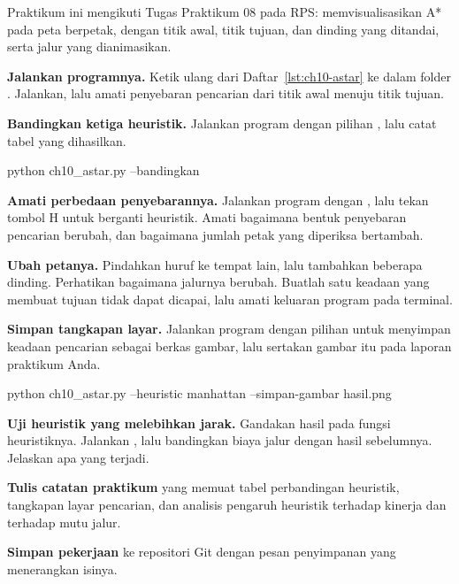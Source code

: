 \begin{praktikumbox}
Praktikum ini mengikuti Tugas Praktikum 08 pada RPS: memvisualisasikan A* pada
peta berpetak, dengan titik awal, titik tujuan, dan dinding yang ditandai,
serta jalur yang dianimasikan.

\begin{langkah}
  \item \textbf{Jalankan programnya.} Ketik ulang  dari
        Daftar~\ref{lst:ch10-astar} ke dalam folder . Jalankan, lalu
        amati penyebaran pencarian dari titik awal menuju titik tujuan.

  \item \textbf{Bandingkan ketiga heuristik.} Jalankan program dengan pilihan
        , lalu catat tabel yang dihasilkan.
\begin{kodekeluaran}
python ch10_astar.py --bandingkan
\end{kodekeluaran}

  \item \textbf{Amati perbedaan penyebarannya.} Jalankan program dengan
        , lalu tekan tombol H untuk berganti
        heuristik. Amati bagaimana bentuk penyebaran pencarian berubah, dan
        bagaimana jumlah petak yang diperiksa bertambah.

  \item \textbf{Ubah petanya.} Pindahkan huruf  ke tempat lain, lalu
        tambahkan beberapa dinding. Perhatikan bagaimana jalurnya berubah.
        Buatlah satu keadaan yang membuat tujuan tidak dapat dicapai, lalu
        amati keluaran program pada terminal.

  \item \textbf{Simpan tangkapan layar.} Jalankan program dengan pilihan
         untuk menyimpan keadaan pencarian sebagai
        berkas gambar, lalu sertakan gambar itu pada laporan praktikum Anda.
\begin{kodekeluaran}
python ch10_astar.py --heuristic manhattan --simpan-gambar hasil.png
\end{kodekeluaran}

  \item \textbf{Uji heuristik yang melebihkan jarak.} Gandakan hasil
         pada fungsi heuristiknya. Jalankan
        , lalu bandingkan biaya jalur dengan hasil
        sebelumnya. Jelaskan apa yang terjadi.

  \item \textbf{Tulis catatan praktikum} yang memuat tabel perbandingan
        heuristik, tangkapan layar pencarian, dan analisis pengaruh heuristik
        terhadap kinerja dan terhadap mutu jalur.

  \item \textbf{Simpan pekerjaan} ke repositori Git dengan pesan penyimpanan
        yang menerangkan isinya.
\end{langkah}
\end{praktikumbox}

